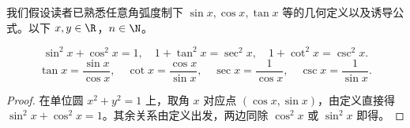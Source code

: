 我们假设读者已熟悉任意角弧度制下 $\sin x, \cos x, \tan x$ 等的几何定义以及诱导公式。以下 $x, y \in \R$，$n \in \N$。

\begin{proposition}[同角基本关系]
	\[
	\sin^2 x + \cos^2 x = 1, \quad
	1 + \tan^2 x = \sec^2 x, \quad
	1 + \cot^2 x = \csc^2 x.
	\]
	\[
	\tan x = \frac{\sin x}{\cos x}, \quad
	\cot x = \frac{\cos x}{\sin x}, \quad
	\sec x = \frac{1}{\cos x}, \quad
	\csc x = \frac{1}{\sin x}.
	\]
\end{proposition}

\begin{proof}
	在单位圆 $x^2+y^2=1$ 上，取角 $x$ 对应点 $(\cos x, \sin x)$，由定义直接得 $\sin^2 x + \cos^2 x = 1$。其余关系由定义出发，两边同除 $\cos^2 x$ 或 $\sin^2 x$ 即得。
\end{proof}

